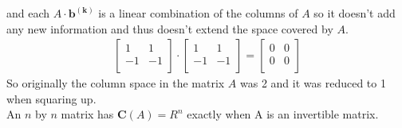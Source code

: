 \documentclass[a4paper,11pt]{article}
\newcommand{\mybf}[1]{\boldsymbol{#1}}
\begin{document}
and each $A \cdot \mybf{b^{(k)}}$ is a linear combination of the columns of $A$ so it doesn't add any new information and thus doesn't extend the space covered by $A$.\\
\begin{align}
\begin{bmatrix}
1 & 1\\
-1 & -1\\
\end{bmatrix}
\cdot
\begin{bmatrix}
1 & 1\\
-1 & -1\\
\end{bmatrix}
=
\begin{bmatrix}
0 & 0\\
0 & 0\\
\end{bmatrix}
\end{align}
So originally the column space in the matrix $A$ was 2 and it was reduced to 1 when squaring up.\\
An $n$ by $n$ matrix has $\mybf{C}(A) = R^n$ exactly when A is an invertible matrix.
\end{document}

